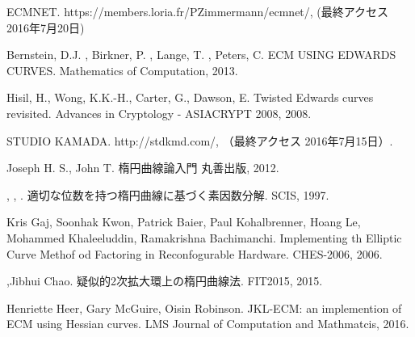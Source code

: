 \documentclass[openany,11pt,papersize]{jsbook}
\begin{document}
\begin{thebibliography}{9}

\newblock ECMNET.
\newblock https://members.loria.fr/PZimmermann/ecmnet/, (最終アクセス 2016年7月20日)

\newblock Bernstein, D.J. , Birkner, P. , Lange, T. , Peters, C.
\newblock ECM USING EDWARDS CURVES.
\newblock Mathematics of Computation, 2013.

\newblock Hisil, H., Wong, K.K.-H., Carter, G., Dawson, E.
\newblock Twisted Edwards curves revisited.
\newblock Advances in Cryptology - ASIACRYPT 2008, 2008.

\newblock STUDIO KAMADA. 
\newblock http://stdkmd.com/, （最終アクセス 2016年7月15日）.

\newblock Joseph H. S., John T.
\newblock 楕円曲線論入門
\newblock 丸善出版, 2012.

{}{},
 {}{},
 {}{}.
\newblock 適切な位数を持つ楕円曲線に基づく素因数分解.
\newblock SCIS, 1997.


\newblock Kris Gaj, Soonhak Kwon, Patrick Baier, Paul Kohalbrenner, Hoang Le, Mohammed Khaleeluddin, Ramakrishna Bachimanchi.
\newblock Implementing th Elliptic Curve Methof od Factoring in Reconfogurable Hardware.
\newblock CHES-2006, 2006.

,Jibhui Chao.
\newblock 疑似的2次拡大環上の楕円曲線法.
\newblock FIT2015, 2015.

\newblock Henriette Heer, Gary McGuire, Oisin Robinson.
\newblock JKL-ECM: an implemention of ECM using Hessian curves.
\newblock LMS Journal of Computation and Mathmatcis, 2016.

\end{thebibliography}
\end{document}
